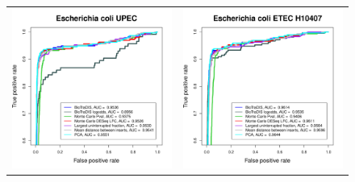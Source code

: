 \documentclass[12pt,letterpaper]{article}
\begin{document}
\begin{figure}
\centering
\begin{tabular}{c c}
\includegraphics[page=1, scale=0.5]{essential-call-comparison-NCTC13441.pdf} &
\includegraphics[page=1, scale=0.5]{essential-call-comparison-ETEC.pdf} \\

\end{tabular}
\end{figure}
\end{document}
